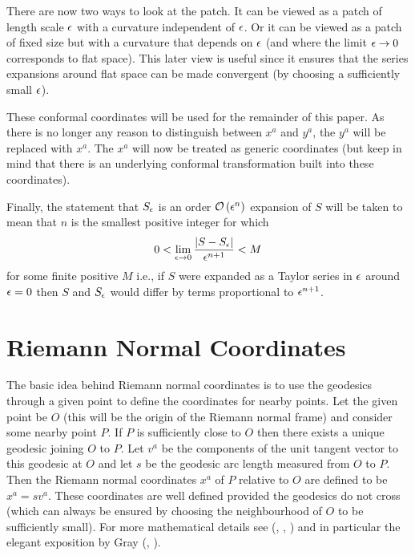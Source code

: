 \documentclass[a4paper,12pt]{article}
\numberwithin{equation}{section}
\begin{document}
There are now two ways to look at the patch. It can be viewed as a patch of length scale
$\epsilon$ with a curvature independent of $\epsilon$. Or it can be viewed as a patch of fixed size
but with a curvature that depends on $\epsilon$ (and where the limit $\epsilon\rightarrow0$
corresponds to flat space). This later view is useful since it ensures that the series
expansions around flat space can be made convergent (by choosing a sufficiently small
$\epsilon$).

These conformal coordinates will be used for the remainder of this paper. As there is no
longer any reason to distinguish between $x^a$ and $y^a$, the $y^a$ will be replaced with
$x^a$. The $x^a$ will now be treated as generic coordinates (but keep in mind that there is
an underlying conformal transformation built into these coordinates).

Finally, the statement that $S_\epsilon$ is an order $\mathcal{O}\left(\epsilon^n\right)$ expansion of $S$ will be
taken to mean that $n$ is the smallest positive integer for which
\[
0 < \lim_{\epsilon\rightarrow0} \frac{\vert S-S_\epsilon\vert}{\epsilon^{n+1}} < M
\]
for some finite positive $M$ i.e., if $S$ were expanded as a Taylor series in $\epsilon$ around
$\epsilon=0$ then $S$ and $S_\epsilon$ would differ by terms proportional to $\epsilon^{n+1}$.



\section{Riemann Normal Coordinates}\label{sec:RNC}

The basic idea behind Riemann normal coordinates is to use the geodesics through a given
point to define the coordinates for nearby points. Let the given point be $O$ (this will be
the origin of the Riemann normal frame) and consider some nearby point $P$. If $P$ is
sufficiently close to $O$ then there exists a unique geodesic joining $O$ to $P$. Let $v^a$
be the components of the unit tangent vector to this geodesic at $O$ and let $s$ be the
geodesic arc length measured from $O$ to $P$. Then the Riemann normal coordinates $x^a$ of
$P$ relative to $O$ are defined to be $x^a = s v^a$. These coordinates are well defined
provided the geodesics do not cross (which can always be ensured by choosing the
neighbourhood of $O$ to be sufficiently small). For more mathematical details see
(\cite{chern-chen-lam:2000-01},
\cite{chavel:2006-01},
\cite{eisenhart:1926-01})
and in particular the elegant exposition by Gray
(\cite{gray:1973-01}, \cite{willmore:1996-01}).
\end{document}

